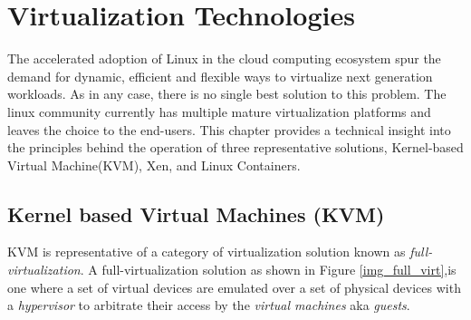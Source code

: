 \chapter{Virtualization Technologies}
The accelerated adoption of Linux in the cloud computing ecosystem spur the demand for dynamic, efficient and flexible ways to virtualize next generation workloads. As in any case, there is no single best solution to this problem. The linux community currently has multiple mature virtualization platforms and leaves the choice to the end-users. This chapter provides a technical insight into the principles behind the operation of three representative solutions, Kernel-based Virtual Machine(KVM), Xen, and Linux Containers.


\section{Kernel based Virtual Machines (KVM)}

KVM is representative of a category of virtualization solution known as \emph{full-virtualization}. A full-virtualization solution as shown in Figure \ref{img_full_virt},is one where a set of virtual devices are emulated over a set of physical devices with a \emph{hypervisor} to arbitrate their access by the \emph{virtual machines} aka \emph{guests}.


